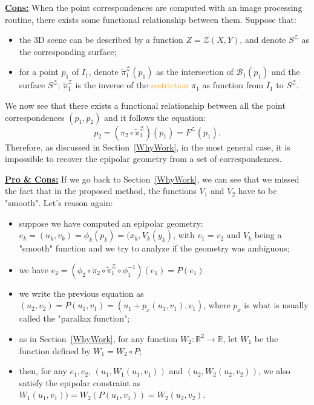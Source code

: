 \documentclass{ipol}
\newcommand{\RR}{\ensuremath{\mathbb{R}}}
\newcommand{\Bund}[1]{\ensuremath{\mathcal{B}_{#1}}}
\newcommand{\BundO}{\Bund{1}}
\newcommand{\PiZVert}{\widetilde{\pi}_1^{\mathcal{Z}} }
\newcommand{\er}[1]{\textcolor{orange}{#1}}
\begin{document}
{\underline {\bf Cons:}} When the point correspondences are computed with an image processing routine,
 there exists some functional relationship between them. Suppose that:

\begin{itemize}
   \item the 3D scene can be described by a function $Z=\mathcal{Z}(X,Y)$,
         and denote $S^\mathcal{Z}$ as the corresponding surface;
   \item for a point $p_1$ of $I_1$, denote $ \PiZVert (p_1)$
         as the intersection of  $\BundO(p_1)$ and the surface  $S^\mathcal{Z}$;
         $\PiZVert$ is the inverse of the \er{restriction}  $\pi_1$ 
         as function from $I_1$ to $S^\mathcal{Z}$.
\end{itemize}
We now see that there exists a functional relationship between all the point correspondences $(p_1,p_2)$ and it follows the equation:
\begin{equation}
   p_2 = (\pi_2 \circ  \PiZVert) (p_1) = F^\mathcal{Z}(p_1).
\end{equation}
%
Therefore, as discussed in Section~\ref{WhyWork}, in the most general
case, it is impossible to recover the epipolar geometry from a set of correspondences.%

{\underline {\bf Pro \& Cons:}} If we go back  to Section~\ref{WhyWork},
we can see that we missed the fact that in the proposed method,
the functions $V_1$ and $V_2$ have to be "smooth". 
Let's reason again:

\begin{itemize}
   \item suppose we have computed an epipolar geometry: $e_k=(u_k,v_k)=\phi_k(p_k) = (x_k,V_k(y_k)$,
         with $v_1=v_2$ and $V_k$ being a "smooth" function and we try to analyze if the
         geometry was ambiguous;

   \item  we have $e_2 = (\phi_2 \circ  \pi_2 \circ  \PiZVert \circ  \phi_1^{-1}) (e_1) = P(e_1)$

    \item we write the previous equation as $(u_2,v_2) = P(u_1,v_1) = (u_1 + p_x(u_1,v_1),v_1)$,  where
          $p_x$ is what is usually called the "parallax function"; 

   \item as in Section~\ref{WhyWork},  for any function $W_2 : \RR^2 \rightarrow \RR  $, let $W_1$ be the function
         defined by $W_1 = W_2 \circ P$;

   \item then, for any $e_1,e_2$, $(u_1,W_1(u_1,v_1))$ and $(u_2,W_2(u_2,v_2))$, we also satisfy the epipolar constraint
         as $W_1(u_1,v_1)) = W_2 (P(u_1,v_1)) = W_2(u_2,v_2)$.

\end{itemize}
\end{document}
